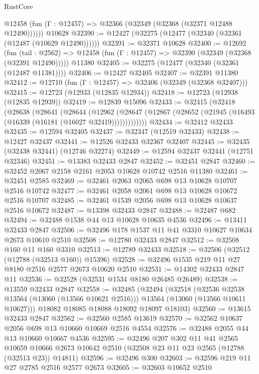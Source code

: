 \begin{lexlean}{RustCore}
\begin{coremodule}
      @12458 (fun (Γ : @12457) => @32366 (@32349 (@32368 (@32371 @12488 @12490))))))
    @10628
@32390 := @12427 (@32275 (@12477 (@32340 (@32361 (@12487 (@10629 @12490))))))
@32391 := @32371 @10628
@32400 := @12692
    (fun (tail : @2562) => @12458 (fun (Γ : @12457) => @32390 (@32349 (@32368 (@32391 @12490)))))
    @11380
@32405 := @32275 (@12477 (@32340 (@32361 (@12487 @11381))))
@32406 := @12427 @32405
@32407 := @32391 @11380
@32412 := @12710 (fun (Γ : @12457) => @32406 (@32349 (@32368 @32407)))
@32415 := @12723 (@12933 (@12835 @12934))
@32418 := @12723 (@12938 (@12835 @12939))
@32419 := @12839 @15096
@32433 := @32415
    (@32418
      (@28638
        (@28641
          (@28644
            (@12962
              (@28647 (@12867 (@28652 (@21945 (@16493 (@16339 (@16181 (@16027 @32419)))))))))))))
@32434 := @32412 @32433
@32435 := @12594 @32405
@32437 := @32347 (@12519 @32433)
@32438 := @12427 @32437
@32441 := @12526 @32433 @32367 @32407
@32445 := @32435 (@32438 @32441) (@12746 @32274)
@32449 := @12594 @32437 @32441 (@12751 @32346)
@32451 := @13383 @32433 @2847
@32452 := @32451 @2847
@32460 := @32452 @2067 @2158 @2161 @2053 @10628 @10742 @2516 @11380
@32461 := @32451 @2585
@32469 := @32461 @2063 @2065 @698 @13 @10628 @10707 @2516 @10742
@32477 := @32461 @2058 @2061 @698 @13 @10628 @10672 @2516 @10707
@32485 := @32461 @1539 @2056 @698 @13 @10628 @10637 @2516 @10672
@32487 := @13398 @32433 @2847
@32488 := @32487 @682
@32494 := @32488 @1538 @44 @13 @10628 @10635 @4536
@32496 := @13411 @32433 @2847
@32506 := @32496 @178 @1537 @11 @41 @3310 @10627 @10634 @2673 @10610 @2510
@32508 := @12780 @32433 @2847
@32512 := @32508 @160 @11 @160 @3310
@32513 := @12789 @32433
@32518 := @32506 (@32512 (@12788 (@32513 @160)) @15396)
@32528 := @32496 @1535 @219 @11 @27 @8180 @2516 @2577 @2673 @10620 @2510
@32531 := @14302 @32433 @2847 @11
@32536 := @32528 (@32531 @1534 @8180 @26485 @26489)
@32538 := @13559 @32433 @2847
@32558 := @32485
    (@32494
      (@32518
        (@32536 @32538 @13564 (@13060 (@13566 @10621 @2516)))
        @13564
        (@13060 (@13566 @10611 @10627)))
      @18082
      @18085
      @18088
      @18092
      @18097
      @18103)
@32560 := @13615 @32433 @2847
@32562 := @32560 @2585 @13619
@32570 := @32562 @10637 @2056 @698 @13 @10660 @10669 @2516 @4554
@32576 := @32488 @2055 @44 @13 @10660 @10667 @4536
@32595 := @32496
    @207
    @302
    @11
    @41
    @2565
    @10659
    @10666
    @2673
    @10642
    @2510
    (@32508 @23 @11 @23 @2565 (@12788 (@32513 @23)) @14811)
@32596 := @32496 @300
@32603 := @32596 @219 @11 @27 @2785 @2516 @2577 @2673
@32605 := @32603 @10652 @2510

\end{coremodule}
\end{lexlean}
